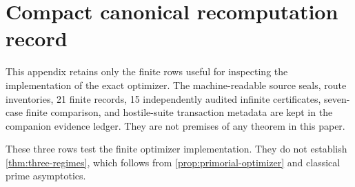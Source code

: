 \section{Compact canonical recomputation record}
\label{app:canonical-evidence}

This appendix retains only the finite rows useful for inspecting the
implementation of the exact optimizer.  The machine-readable source seals,
route inventories, 21 finite records, 15 independently audited infinite
certificates, seven-case finite comparison, and hostile-suite transaction
metadata are kept in the companion evidence ledger.  They are not premises
of any theorem in this paper.

\begin{table}[h]
\centering
\caption{Exact finite optimizer rows generated from the sealed projection.
The supercritical finite row has several ties; the canonical maximizer and
the primorial label are both 900.}
\label{tab:finite-primorial}

\end{table}

These three rows test the finite optimizer implementation.  They do not
establish \cref{thm:three-regimes}, which follows from
\cref{prop:primorial-optimizer} and classical prime asymptotics.
